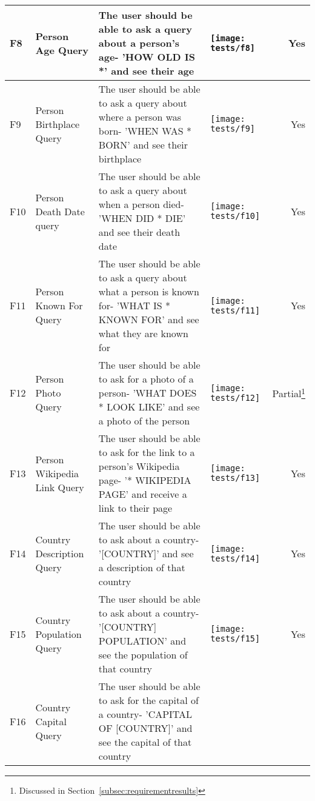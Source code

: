 \begin{landscape}
\begin{tabularx}{\hsize}{lXXXr}
		\midrule
		F8 & Person Age Query
		& The user should be able to ask a query about a person's age\newline - 'HOW OLD IS *' and see their age
		& \texttt{[image: tests/f8]} & Yes \\
		\midrule
		F9 & Person Birthplace Query
		& The user should be able to ask a query about where a person was born\newline - 'WHEN WAS * BORN' and see their birthplace
		& \texttt{[image: tests/f9]} & Yes \\
		\midrule
		F10 & Person Death Date query
		& The user should be able to ask a query about when a person died\newline - 'WHEN DID * DIE' and see their death date
		& \texttt{[image: tests/f10]} & Yes \\
		\midrule
		F11 & Person Known For Query
		& The user should be able to ask a query about what a person is known for\newline - 'WHAT IS * KNOWN FOR' and see what they are known for
		& \texttt{[image: tests/f11]} & Yes \\
		\midrule
		F12 & Person Photo Query
		& The user should be able to ask for a photo of a person\newline - 'WHAT DOES * LOOK LIKE' and see a photo of the person
		& \texttt{[image: tests/f12]} & Partial\footnote{\label{fn:discuss}Discussed in Section~\ref{subsec:requirementresults}} \\
		\midrule
		F13 & Person Wikipedia Link Query
		& The user should be able to ask for the link to a person's Wikipedia page\newline - '* WIKIPEDIA PAGE' and receive a link to their page
		& \texttt{[image: tests/f13]} & Yes \\
		\midrule
		F14 & Country Description Query
		& The user should be able to ask about a country\newline - '[COUNTRY]' and see a description of that country
		& \texttt{[image: tests/f14]} & Yes \\
		\midrule
		F15 & Country Population Query
		& The user should be able to ask about a country\newline - '[COUNTRY] POPULATION' and see the population of that country
		& \texttt{[image: tests/f15]} & Yes \\
		\midrule
		F16 & Country Capital Query
		& The user should be able to ask for the capital of a country\newline - 'CAPITAL OF [COUNTRY]' and see the capital of that country

\end{tabularx}
\end{landscape}

